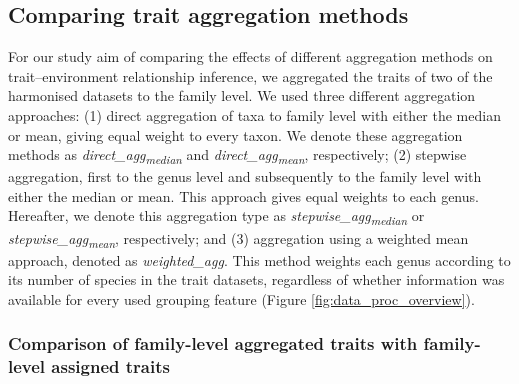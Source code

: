 \documentclass{article}
\begin{document}

\subsection*{Comparing trait aggregation methods}

For our study aim of comparing the effects of different aggregation methods on trait–environment relationship inference, we aggregated the traits of two of the harmonised datasets to the family level.
We used three different aggregation approaches: (1) direct aggregation of taxa to family level with either the median or mean, giving equal weight to every taxon. We denote these aggregation methods as \textit{direct\_agg\textsubscript{median}} and \textit{direct\_agg\textsubscript{mean}}, respectively; (2) stepwise aggregation, first to the genus level and subsequently to the family level with either the median or mean. This approach gives equal weights to each genus. Hereafter, we denote this aggregation type as \textit{stepwise\_agg\textsubscript{median}} or \textit{stepwise\_agg\textsubscript{mean}}, respectively; and (3) aggregation using a weighted mean approach, denoted as \textit{weighted\_agg}. This method weights each genus according to its number of species in the trait datasets, regardless of whether information was available for every used grouping feature (Figure \ref{fig:data_proc_overview}). 


\subsubsection*{Comparison of family-level aggregated traits with family-level assigned traits}
\end{document}
